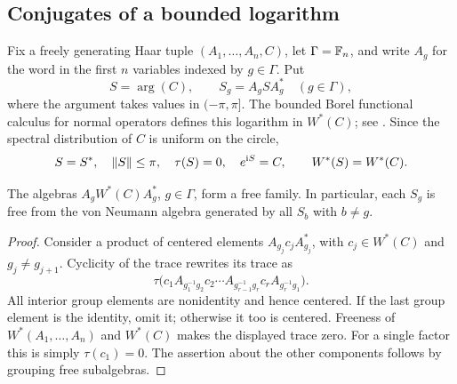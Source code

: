\subsection{Conjugates of a bounded logarithm}
Fix a freely generating Haar tuple $(A_1,\ldots,A_n,C)$, let $\Gamma=\mathbb F_n$, and write $A_g$ for the word in the first $n$ variables indexed by $g\in\Gamma$. Put
\begin{equation}\label{eq:logarithm}
 S=\arg(C),\qquad S_g=A_gSA_g^*\quad(g\in\Gamma),
\end{equation}
where the argument takes values in $(-\pi,\pi]$. The bounded Borel functional calculus for normal operators defines this logarithm in $W^*(C)$; see \cite[Theorem~7.1]{haase2020}. Since the spectral distribution of $C$ is uniform on the circle,
\[
 S=S^*,\quad \left\lVert S\right\rVert\leq\pi,\quad \tau(S)=0,\quad e^{\mathrm i S}=C,
 \qquad W^*(S)=W^*(C).
\]

\begin{lemma}\label{lem:conjugates}
The algebras $A_gW^*(C)A_g^*$, $g\in\Gamma$, form a free family. In particular, each $S_g$ is free from the von Neumann algebra generated by all $S_b$ with $b\ne g$.
\end{lemma}
\begin{proof}
Consider a product of centered elements $A_{g_j}c_jA_{g_j}^*$, with $c_j\in W^*(C)$ and $g_j\ne g_{j+1}$. Cyclicity of the trace rewrites its trace as
\[
 \tau\bigl(c_1 A_{g_1^{-1}g_2}c_2\cdots
          A_{g_{r-1}^{-1}g_r}c_r A_{g_r^{-1}g_1}\bigr).
\]
All interior group elements are nonidentity and hence centered. If the last group element is the identity, omit it; otherwise it too is centered. Freeness of $W^*(A_1,\ldots,A_n)$ and $W^*(C)$ makes the displayed trace zero. For a single factor this is simply $\tau(c_1)=0$. The assertion about the other components follows by grouping free subalgebras.
\end{proof}

